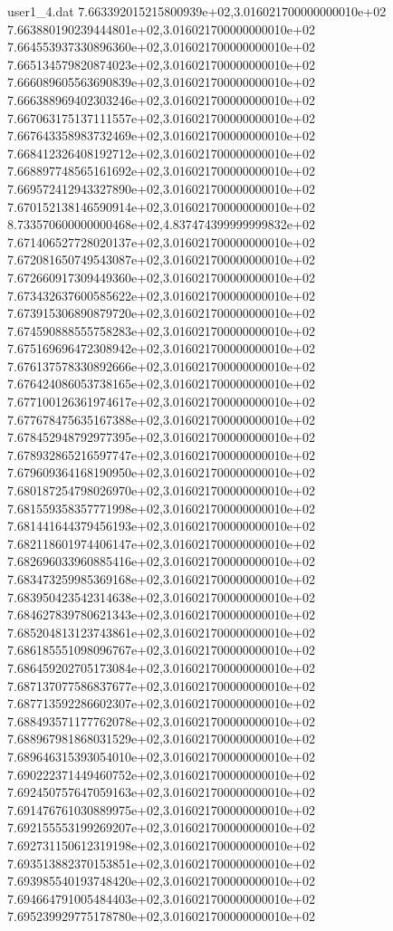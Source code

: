 \begin{filecontents}{user1_4.dat}
7.663392015215800939e+02,3.016021700000000010e+02
7.663880190239444801e+02,3.016021700000000010e+02
7.664553937330896360e+02,3.016021700000000010e+02
7.665134579820874023e+02,3.016021700000000010e+02
7.666089605563690839e+02,3.016021700000000010e+02
7.666388969402303246e+02,3.016021700000000010e+02
7.667063175137111557e+02,3.016021700000000010e+02
7.667643358983732469e+02,3.016021700000000010e+02
7.668412326408192712e+02,3.016021700000000010e+02
7.668897748565161692e+02,3.016021700000000010e+02
7.669572412943327890e+02,3.016021700000000010e+02
7.670152138146590914e+02,3.016021700000000010e+02
8.733570600000000468e+02,4.837474399999999832e+02
7.671406527728020137e+02,3.016021700000000010e+02
7.672081650749543087e+02,3.016021700000000010e+02
7.672660917309449360e+02,3.016021700000000010e+02
7.673432637600585622e+02,3.016021700000000010e+02
7.673915306890879720e+02,3.016021700000000010e+02
7.674590888555758283e+02,3.016021700000000010e+02
7.675169696472308942e+02,3.016021700000000010e+02
7.676137578330892666e+02,3.016021700000000010e+02
7.676424086053738165e+02,3.016021700000000010e+02
7.677100126361974617e+02,3.016021700000000010e+02
7.677678475635167388e+02,3.016021700000000010e+02
7.678452948792977395e+02,3.016021700000000010e+02
7.678932865216597747e+02,3.016021700000000010e+02
7.679609364168190950e+02,3.016021700000000010e+02
7.680187254798026970e+02,3.016021700000000010e+02
7.681559358357771998e+02,3.016021700000000010e+02
7.681441644379456193e+02,3.016021700000000010e+02
7.682118601974406147e+02,3.016021700000000010e+02
7.682696033960885416e+02,3.016021700000000010e+02
7.683473259985369168e+02,3.016021700000000010e+02
7.683950423542314638e+02,3.016021700000000010e+02
7.684627839780621343e+02,3.016021700000000010e+02
7.685204813123743861e+02,3.016021700000000010e+02
7.686185551098096767e+02,3.016021700000000010e+02
7.686459202705173084e+02,3.016021700000000010e+02
7.687137077586837677e+02,3.016021700000000010e+02
7.687713592286602307e+02,3.016021700000000010e+02
7.688493571177762078e+02,3.016021700000000010e+02
7.688967981868031529e+02,3.016021700000000010e+02
7.689646315393054010e+02,3.016021700000000010e+02
7.690222371449460752e+02,3.016021700000000010e+02
7.692450757647059163e+02,3.016021700000000010e+02
7.691476761030889975e+02,3.016021700000000010e+02
7.692155553199269207e+02,3.016021700000000010e+02
7.692731150612319198e+02,3.016021700000000010e+02
7.693513882370153851e+02,3.016021700000000010e+02
7.693985540193748420e+02,3.016021700000000010e+02
7.694664791005484403e+02,3.016021700000000010e+02
7.695239929775178780e+02,3.016021700000000010e+02

\end{filecontents}
